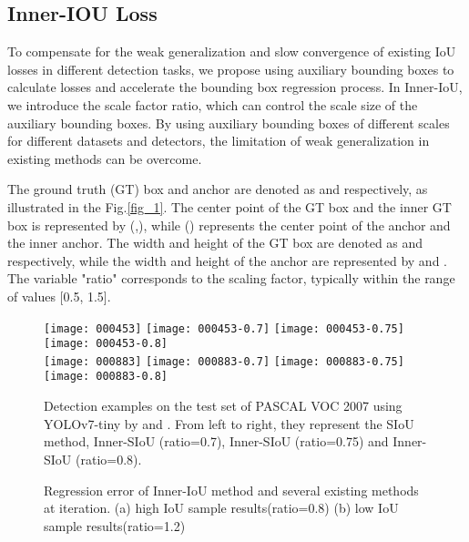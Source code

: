 \documentclass[lettersize,journal]{IEEEtran}
\begin{document}
	\subsection{Inner-IOU Loss}
	To compensate for the weak generalization and slow convergence of existing IoU losses\cite{ref1,ref2,ref3,ref4,ref5} in different detection tasks, we propose using auxiliary bounding boxes to calculate losses and accelerate the bounding box regression process. In Inner-IoU, we introduce the scale factor ratio, which can control the scale size of the auxiliary bounding boxes. By using auxiliary bounding boxes of different scales for different datasets and detectors, the limitation of weak generalization in existing methods can be overcome. 
	\par The ground truth (GT) box and anchor are denoted as  and  respectively, as illustrated in the Fig.\ref{fig_1}. The center point of the GT box and the inner GT box is represented by (,), while () represents the center point of the anchor and the inner anchor. The width and height of the GT box are denoted as  and  respectively, while the width and height of the anchor are represented by  and . The variable "ratio" corresponds to the scaling factor, typically within the range of values [0.5, 1.5].
	\begin{figure*} [h]
		\centering
			\texttt{[image: 000453]}
		\hspace{0.1cm}
		\vspace{0.4cm}
			\texttt{[image: 000453-0.7]}
		\hspace{0.1cm}
			\texttt{[image: 000453-0.75]}
		\hspace{0.1cm}
			\texttt{[image: 000453-0.8]}
		\\
		\centering
			\texttt{[image: 000883]}
		\hspace{0.015cm}
			\texttt{[image: 000883-0.7]}
		\hspace{0.1cm}
			\texttt{[image: 000883-0.75]}
		\hspace{0.1cm}
			\texttt{[image: 000883-0.8]}
		\caption{Detection examples on the test set of PASCAL VOC 2007 using YOLOv7-tiny by   and . From left to right, they represent the SIoU method, Inner-SIoU (ratio=0.7), Inner-SIoU (ratio=0.75) and Inner-SIoU (ratio=0.8). }
		\label{fig_5} 
	\end{figure*}
		\begin{figure*}[!htbp]
		\hspace{2cm}
		\caption{Regression error of Inner-IoU method and several existing methods at iteration. 
		(a) high IoU sample results(ratio=0.8) (b) low IoU sample results(ratio=1.2)}
		\label{fig_4}
	\end{figure*}
	
\end{document}
